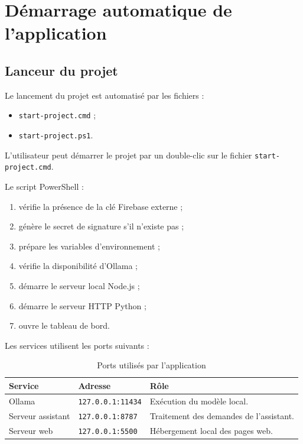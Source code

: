 \documentclass{rapportENSIAS}
\begin{document}
\section{Démarrage automatique de l’application}

\subsection{Lanceur du projet}

Le lancement du projet est automatisé par les fichiers :

\begin{itemize}
    \item \texttt{start-project.cmd} ;
    \item \texttt{start-project.ps1}.
\end{itemize}

L’utilisateur peut démarrer le projet par un double-clic sur le fichier \texttt{start-project.cmd}.

Le script PowerShell :

\begin{enumerate}
    \item vérifie la présence de la clé Firebase externe ;
    \item génère le secret de signature s’il n’existe pas ;
    \item prépare les variables d’environnement ;
    \item vérifie la disponibilité d’Ollama ;
    \item démarre le serveur local Node.js ;
    \item démarre le serveur HTTP Python ;
    \item ouvre le tableau de bord.
\end{enumerate}

Les services utilisent les ports suivants :

\begin{table}[H]
    \centering
    \caption{Ports utilisés par l’application}
    \label{tab:ports}
    \begin{tabular}{|p{5cm}|p{4cm}|p{4cm}|}
        \hline
        \textbf{Service} & \textbf{Adresse} & \textbf{Rôle} \\
        \hline
        Ollama & \texttt{127.0.0.1:11434} & Exécution du modèle local. \\
        \hline
        Serveur assistant & \texttt{127.0.0.1:8787} & Traitement des demandes de l’assistant. \\
        \hline
        Serveur web & \texttt{127.0.0.1:5500} & Hébergement local des pages web. \\
        \hline
    \end{tabular}
\end{table}
\end{document}
